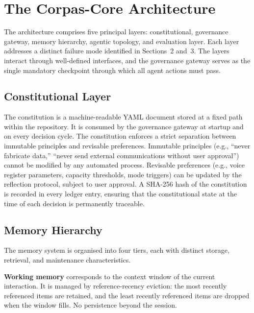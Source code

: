 \documentclass[11pt,a4paper]{article}
\begin{document}
\section{The Corpas-Core Architecture}

The architecture comprises five principal layers: constitutional, governance gateway, memory hierarchy, agentic topology, and evaluation layer. Each layer addresses a distinct failure mode identified in Sections~2 and~3. The layers interact through well-defined interfaces, and the governance gateway serves as the single mandatory checkpoint through which all agent actions must pass.

\subsection{Constitutional Layer}

The constitution is a machine-readable YAML document stored at a fixed path within the repository. It is consumed by the governance gateway at startup and on every decision cycle. The constitution enforces a strict separation between immutable principles and revisable preferences. Immutable principles (e.g., ``never fabricate data,'' ``never send external communications without user approval'') cannot be modified by any automated process. Revisable preferences (e.g., voice register parameters, capacity thresholds, mode triggers) can be updated by the reflection protocol, subject to user approval. A SHA-256 hash of the constitution is recorded in every ledger entry, ensuring that the constitutional state at the time of each decision is permanently traceable.

\subsection{Memory Hierarchy}

The memory system is organised into four tiers, each with distinct storage, retrieval, and maintenance characteristics.

\textbf{Working memory} corresponds to the context window of the current interaction. It is managed by reference-recency eviction: the most recently referenced items are retained, and the least recently referenced items are dropped when the window fills. No persistence beyond the session.
\end{document}
